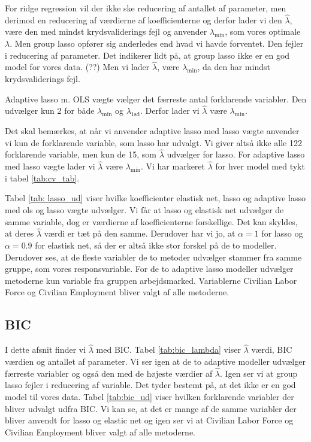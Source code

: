 For ridge regression vil der ikke ske reducering af antallet af parameter, men derimod en reducering af værdierne af koefficienterne og derfor lader vi den $\widehat{\lambda}$, være den med mindst krydsvaliderings fejl og anvender $\lambda_{\min}$, som vores optimale $\lambda$. 
%
Men group lasso opfører sig anderledes end hvad vi havde forventet. 
Den fejler i reducering af parameter. 
Det indikerer lidt på, at group lasso ikke er en god model for vores data. (??)
Men vi lader $\widehat{\lambda}$, være $\lambda_{\min}$, da den har mindst krydsvaliderings fejl. 

Adaptive lasso m. OLS vægte vælger det færreste antal forklarende variabler. 
Den udvælger kun 2 for både  $\lambda_{\min}$ og $\lambda_{1\text{sd}}$. 
Derfor lader vi $\widehat{\lambda}$ være $\lambda_{\min}$. 

Det skal bemærkes, at når vi anvender adaptive lasso med lasso vægte anvender vi kun de forklarende variable, som lasso har udvalgt. 
Vi giver altså ikke alle 122 forklarende variable, men kun de 15, som $\widehat{\lambda}$ udvælger for lasso.
For adaptive lasso med lasso vægte lader vi $\widehat{\lambda}$ være $\lambda_{\min}$.  
Vi har markeret $\widehat{\lambda}$ for hver model med tykt i tabel  \ref{tab:cv_tab}. 

Tabel \ref{tab: lasso_ud} viser hvilke koefficienter elastisk net, lasso og adaptive lasso med ols og lasso vægte udvælger. 
Vi får at lasso og elastisk net udvælger de samme variable, dog er værdierne af koefficienterne forskellige. 
Det kan skyldes, at deres $\widehat{\lambda}$ værdi er tæt på den samme. 
Derudover har vi jo, at $\alpha = 1$ for lasso og $\alpha = 0.9$ for elastisk net, så der er altså ikke stor forskel på de to modeller. 
Derudover ses, at de fleste variabler de to metoder udvælger stammer fra samme gruppe, som vores responsvariable.  
For de to adaptive lasso modeller udvælger metoderne kun variable fra gruppen arbejdsmarked. 
Variablerne Civilian Labor Force og Civilian Employment bliver valgt af alle metoderne. 



\newpage
\subsection{BIC}
I dette afsnit finder vi $\widehat{\lambda}$ med BIC. 
Tabel \ref{tab:bic_lambda} viser $\widehat{\lambda}$ værdi, BIC værdien og antallet af parameter. Vi ser igen at de to adaptive modeller udvælger færreste variabler og også den med de højeste værdier af $\widehat{\lambda}$. 
Igen ser vi at group lasso fejler i reducering af variable. Det tyder bestemt på, at det ikke er en god model til vores data. 
Tabel \ref{tab:bic_ud} viser hvilken forklarende variabler der bliver udvalgt udfra BIC. 
Vi kan se, at det er mange af de samme variabler der bliver anvendt for lasso og elastic net og igen ser vi at Civilian Labor Force og Civilian Employment bliver valgt af alle metoderne. 




